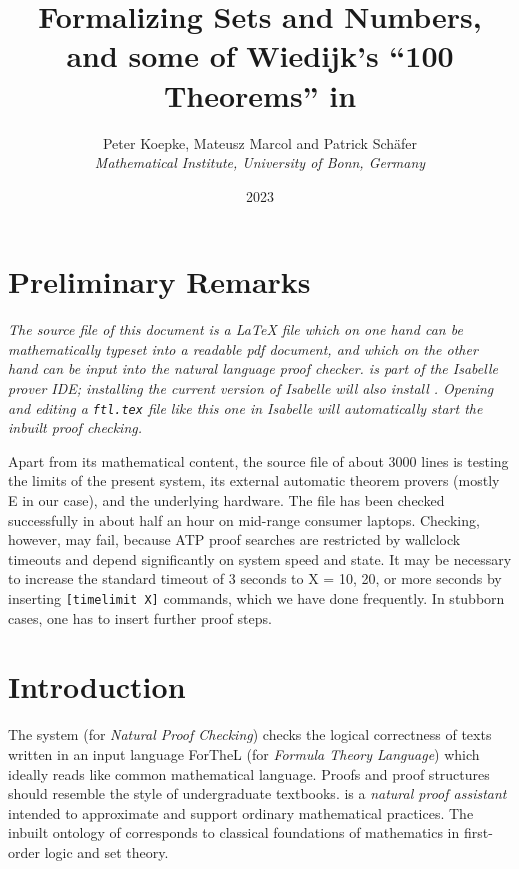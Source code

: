 \documentclass{article}
\begin{document}
\title{Formalizing Sets and Numbers, and some of Wiedijk's
``100 Theorems'' in \Naproche{}}
\author{Peter Koepke, Mateusz Marcol and Patrick Schäfer\\
\emph{Mathematical Institute, University of Bonn, Germany}}
\date{2023}

\maketitle

\begin{forthel}
\end{forthel}

\section*{Preliminary Remarks}

{\em The source file of this document is a \LaTeX{} file which on one hand can be mathematically
typeset into a readable pdf document, and which on the other hand can
be input into the \Naproche{} natural language proof checker. \Naproche{} is part of the
Isabelle prover IDE; installing the current version of Isabelle will also
install \Naproche{}. Opening and editing a \verb+ftl.tex+ file like this one
in Isabelle will automatically start the inbuilt \Naproche{} proof checking.

Apart from its mathematical content, the source file of about 3000
lines is testing the limits of the present \Naproche{}
system, its external automatic theorem provers (mostly E in our case),
and the underlying hardware. The file has been checked successfully
in about half an hour on mid-range consumer
laptops. Checking, however, may fail, because ATP proof searches
are restricted by wallclock timeouts and depend significantly on system speed and state.
It may be necessary to increase the standard timeout of 3 seconds to X = 10, 20, or
more seconds by inserting \verb+[timelimit X]+ commands, which we have done
frequently. In stubborn cases, one has to insert further proof steps.}

\tableofcontents

\newpage

\section{Introduction}

The \Naproche{} system (for \emph{Natural Proof Checking})
checks the logical correctness of texts
written in an input language ForTheL (for \emph{Formula Theory Language})
which ideally reads like common mathematical language. Proofs and proof
structures should resemble the
style of undergraduate textbooks.
\Naproche{} is a \emph{natural proof assistant} intended to
approximate and support ordinary mathematical practices.
The inbuilt ontology of \Naproche{} corresponds to classical foundations
of mathematics in first-order logic and set theory.
\end{document}
